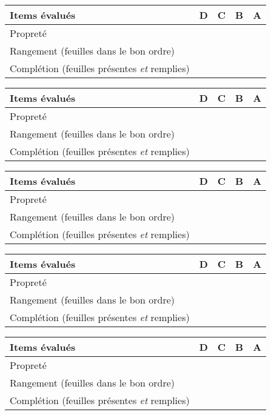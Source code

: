 \newcommand{\competenceClasseur}{
  \begin{center}
    \setlength{\extrarowheight}{6pt}
    \begin{tabular}{| l | c | c | c | c |}
      \hline
      \rowcolor{gray!20} 
      \textbf{Items évalués} & D & C & B & A
      \\ \hline
      Propreté  & & & &
      \\ \hline
      Rangement (feuilles dans le bon ordre) & & & &
      \\ \hline
      Complétion (feuilles présentes \textit{et} remplies) & & & & 
      \\ \hline
    \end{tabular}
  \end{center}
}

\pasDePagination

\competenceClasseur
\bigskip
\competenceClasseur
\bigskip
\competenceClasseur
\bigskip
\competenceClasseur
\bigskip
\competenceClasseur